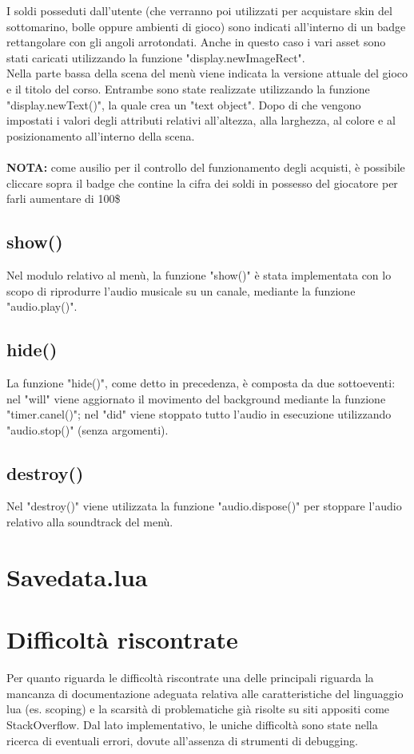 \documentclass[12pt]{article}
\begin{document}
I soldi posseduti dall'utente (che verranno poi utilizzati per acquistare skin del sottomarino, bolle oppure ambienti di gioco) sono 
indicati all'interno di un badge rettangolare con gli angoli arrotondati. Anche in questo caso i vari asset sono stati caricati 
utilizzando la funzione "display.newImageRect". 
\\

Nella parte bassa della scena del menù viene indicata la versione attuale del gioco e il titolo del corso. Entrambe sono state 
realizzate utilizzando la funzione "display.newText()", la quale crea un "text object". Dopo di che vengono impostati i valori degli 
attributi relativi all'altezza, alla larghezza, al colore e al posizionamento all'interno della scena. 
\\
\\
\textbf{NOTA:} come ausilio per il controllo del funzionamento degli acquisti, è possibile cliccare sopra il badge che contine la 
cifra dei soldi in possesso del giocatore per farli aumentare di 100\$ 

\subsection{show()}
Nel modulo relativo al menù, la funzione "show()" è stata implementata con lo scopo di riprodurre l'audio musicale su un canale, 
mediante la funzione "audio.play()".

\subsection{hide()}
La funzione "hide()", come detto in precedenza, è composta da due sottoeventi:  nel "will" viene aggiornato il movimento del 
background mediante la funzione "timer.canel()"; nel "did" viene stoppato tutto l'audio in esecuzione utilizzando "audio.stop()" 
(senza argomenti).

\subsection{destroy()}
Nel "destroy()" viene utilizzata la funzione "audio.dispose()" per stoppare l'audio relativo alla soundtrack del menù. 

\section{Savedata.lua}

\section{Difficoltà riscontrate}
Per quanto riguarda le difficoltà riscontrate una delle principali riguarda la mancanza di documentazione adeguata relativa alle 
caratteristiche del linguaggio lua (es. scoping) e la scarsità di problematiche già risolte su siti appositi come StackOverflow. 
Dal lato implementativo, le uniche difficoltà sono state nella ricerca di eventuali errori, dovute all'assenza di strumenti di 
debugging.
\end{document}
